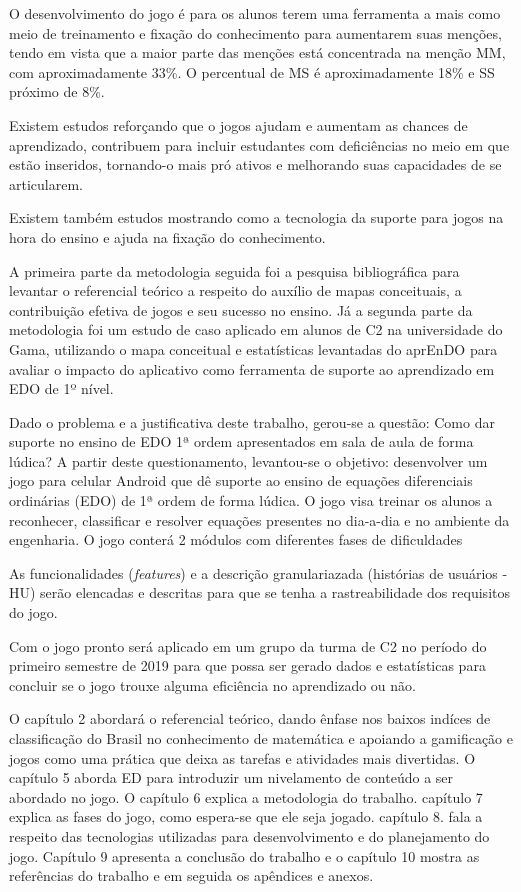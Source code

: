 O desenvolvimento do jogo é para os alunos terem uma ferramenta a mais como meio de treinamento e fixação do conhecimento para aumentarem suas menções, tendo em vista que a maior parte das menções está concentrada na menção MM, com aproximadamente 33\%. O percentual de MS é aproximadamente 18\% e SS próximo de 8\%.




Existem estudos reforçando que o jogos ajudam e aumentam as chances de aprendizado, contribuem para incluir estudantes com deficiências no meio em que estão inseridos, tornando-o mais pró ativos e melhorando suas capacidades de se articularem. 

Existem também estudos mostrando como a tecnologia da suporte para jogos na hora do ensino e ajuda na fixação do conhecimento. 

A primeira parte da metodologia seguida foi a pesquisa bibliográfica para levantar o referencial teórico a respeito do auxílio de mapas conceituais, a contribuição efetiva de jogos e seu sucesso no ensino. Já a segunda parte da metodologia foi um estudo de caso aplicado em alunos de C2 na universidade do Gama, utilizando o mapa conceitual e estatísticas levantadas do aprEnDO para avaliar o impacto do aplicativo como ferramenta de suporte ao aprendizado em EDO de 1º nível.


Dado o problema e a justificativa deste trabalho, gerou-se a questão: Como dar suporte no ensino de EDO 1ª ordem apresentados em sala de aula de forma lúdica? A partir deste questionamento, levantou-se o objetivo: desenvolver um jogo para celular Android que dê suporte ao ensino de equações diferenciais ordinárias (EDO) de 1ª ordem de forma lúdica. O jogo visa treinar os alunos a reconhecer, classificar e resolver equações presentes no dia-a-dia e no ambiente da engenharia.
O jogo conterá 2 módulos com diferentes fases de dificuldades 

As funcionalidades (\textit{features}) e a descrição granulariazada (histórias de usuários - HU) serão elencadas e descritas para que se tenha a rastreabilidade dos requisitos do jogo. 

Com o jogo pronto será aplicado em um grupo da turma de C2 no período do primeiro semestre de 2019 para que possa ser gerado dados e estatísticas para concluir se o jogo trouxe alguma eficiência no aprendizado ou não.

O capítulo 2 abordará o referencial teórico, dando ênfase nos baixos indíces de classificação do Brasil no conhecimento de matemática e apoiando a gamificação e jogos como uma prática que deixa as tarefas e atividades mais divertidas.
O capítulo 5 aborda ED para introduzir um nivelamento de conteúdo a ser abordado no jogo. O capítulo 6 explica a metodologia do trabalho. capítulo 7 explica as fases do jogo, como espera-se que ele seja jogado. capítulo 8. fala a respeito das tecnologias utilizadas para desenvolvimento e do planejamento do jogo. Capítulo 9 apresenta a conclusão do trabalho e o capítulo 10 mostra as referências do trabalho e em seguida os apêndices e anexos.